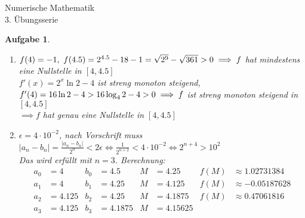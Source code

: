 \documentclass[11pt]{article}
\theoremstyle{break}
\newtheorem{task}{Aufgabe}
\newcommand{\abs}[1]{\ensuremath{\left\vert #1 \right\vert}}
\newcommand{\hw}{3}
\begin{document}
\begin{center}
\Large{Numerische Mathematik}\\
\large{\hw. Übungsserie}
\end{center}
\begin{task}
    \hfill\vspace{-5mm}
    \begin{enumerate}[label={(\alph*)}]
        \item $f(4)=-1,\ f(4.5) = 2^{4.5} - 18 - 1 = \sqrt{2^9} - \sqrt{361} > 0\\
        \implies f$ hat mindestens eine Nullstelle in $[4,4.5]$\vspace{3mm}\\
        $f'(x) = 2^x\ln 2 - 4$ ist streng monoton steigend,\\
        $f'(4)=16\ln 2 - 4 > 16\log_4 2 - 4 > 0\\
        \implies f$ ist streng monoton steigend in $[4,4.5]$\vspace{3mm}\\
        $\implies f$ hat genau eine Nullstelle in $[4,4.5]$
        \item $\epsilon = 4\cdot 10^{-2}$, nach Vorschrift muss $\abs{a_n-b_n} = \frac{\abs{a_n-b_n}}{2^n} < 2\epsilon\iff \frac{1}{2^{n+2}} < 4\cdot 10^{-2}\iff 2^{n+4}>10^2$\\
        Das wird erfüllt mit $n=3$. Berechnung:
        \begin{align*}
            a_0 &= 4     & b_0 &= 4.5     & M &= 4.25      & f(M) &\approx 1.02731384\\
            a_1 &= 4     & b_1 &= 4.25    & M &= 4.125     & f(M) &\approx -0.05187628\\
            a_2 &= 4.125 & b_2 &= 4.25    & M &= 4.1875    & f(M) &\approx 0.47061816\\
            a_3 &= 4.125 & b_3 &= 4.1875  & M &= 4.15625   &&
        \end{align*}
    \end{enumerate}
\end{task}
\end{document}

